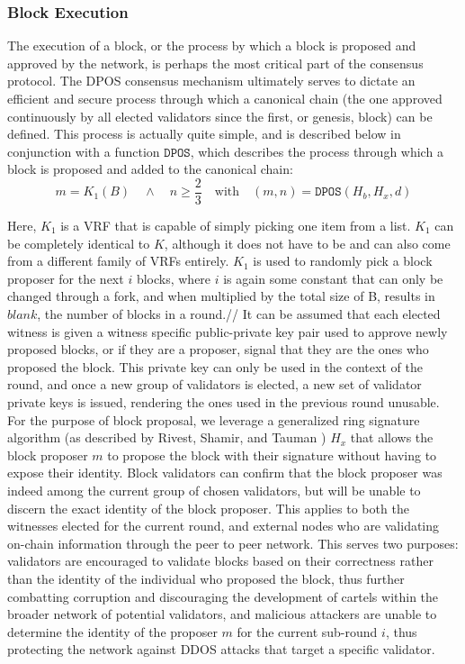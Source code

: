 \documentclass[conference]{IEEEtran}
\begin{document}
\subsubsection{Block Execution}

The execution of a block, or the process by which a block is proposed and approved by the network, is perhaps the most critical part of the consensus protocol. The DPOS consensus mechanism ultimately serves to dictate an efficient and secure process through which a canonical chain (the one approved continuously by all elected validators since the first, or genesis, block) can be defined. This process is actually quite simple, and is described below in conjunction with a function $\mathtt{DPOS}$, which describes the process through which a block is proposed and added to the canonical chain:
\begin{equation}
    m = {K_1(B)} \quad \wedge \quad n \ge \frac{2}{3} \quad
\text{with} \quad (m,n) = \mathtt{DPOS}(H_b,H_x,d) \end{equation}

Here, $K_1$ is a VRF that is capable of simply picking one item from a list. $K_1$ can be completely identical to $K$, although it does not have to be and can also come from a different family of VRFs entirely. $K_1$ is used to randomly pick a block proposer for the next $i$ blocks, where $i$ is again some constant that can only be changed through a fork, and when multiplied by the total size of B, results in $blank$, the number of blocks in a round.//
It can be assumed that each elected witness is given a witness specific public-private key pair used to approve newly proposed blocks, or if they are a proposer, signal that they are the ones who proposed the block. This private key can only be used in the context of the round, and once a new group of validators is elected, a new set of validator private keys is issued, rendering the ones used in the previous round unusable. For the purpose of block proposal, we leverage a generalized ring signature algorithm (as described by Rivest, Shamir, and Tauman \cite{Rivest2001}) $H_x$ that allows the block proposer $m$ to propose the block with their signature without having to expose their identity. Block validators can confirm that the block proposer was indeed among the current group of chosen validators, but will be unable to discern the exact identity of the block proposer. This applies to both the witnesses elected for the current round, and external nodes who are validating on-chain information through the peer to peer network. This serves two purposes: validators are encouraged to validate blocks based on their correctness rather than the identity of the individual who proposed the block, thus further combatting corruption and discouraging the development of cartels within the broader network of potential validators, and malicious attackers are unable to determine the identity of the proposer $m$ for the current sub-round $i$, thus protecting the network against DDOS attacks that target a specific validator. 
\end{document}
